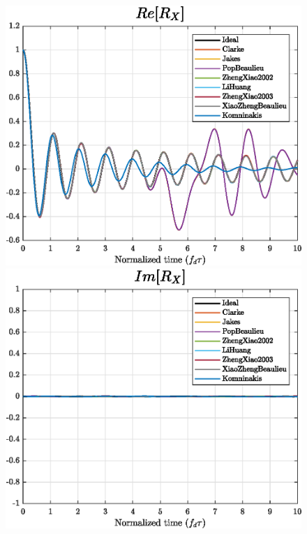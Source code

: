 \begin{figure}
	\hfill
	\begin{minipage}{.32\linewidth}
		\includegraphics[width=\linewidth]{img/ReX.eps}
	\end{minipage}
	\hfill
	\begin{minipage}{.32\linewidth}
		\includegraphics[width=\linewidth]{img/ImX.eps}
	\end{minipage}
	\hfill
	\begin{minipage}{.32\linewidth}

\end{minipage}
\end{figure}
